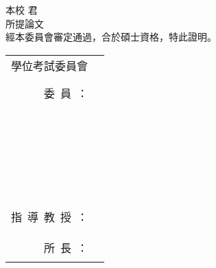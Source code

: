 \vspace{0.5cm}


\fontsize{20}{22}\selectfont
本校 \underline{\deptCname} \underline{\myCname}  君\\
所提論文 \uline{\cTitle} \\
經本委員會審定通過，合於碩士資格，特此證明。 \\

\vspace{0.1cm}
\begin{tabular}{rp{}}
學位考試委員會 \\ & \\
委~員~：
	& \rule{0.6\textwidth}{1pt} \\
	& \\
	& \rule{0.6\textwidth}{1pt} \\
	& \\
	& \rule{0.6\textwidth}{1pt} \\
	& \\
	& \rule{0.6\textwidth}{1pt} \\
	& \\
指~導~教~授~： & \rule{0.6\textwidth}{1pt} \\
	& \\
所~長~： & \rule{0.6\textwidth}{1pt}
\end{tabular}

\vfill
\begin{center}
\end{center}

\clearpage
\normalsize


%

